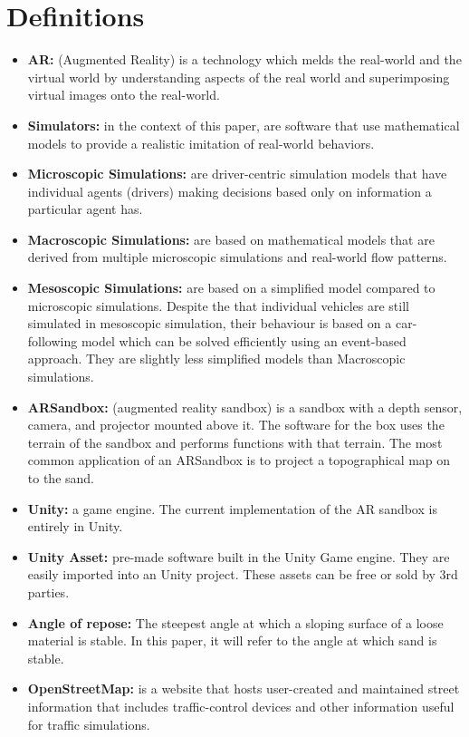 \documentclass[IEEEtran]{article}
\begin{document}
\section*{Definitions}
\begin{itemize}[leftmargin=*,label={}]
    \item \textbf{AR:} (Augmented Reality) is a technology which melds the real-world and the virtual world by understanding aspects of the real world and superimposing virtual images onto the real-world. 
    \item \textbf{Simulators:} in the context of this paper, are software that use mathematical models to provide a realistic imitation of real-world behaviors.  
    \item \textbf{Microscopic Simulations:} are driver-centric simulation models that have individual agents (drivers) making decisions based only on information a particular agent has.
    \item \textbf{Macroscopic Simulations:} are based on mathematical models that are derived from multiple microscopic simulations and real-world flow patterns.
    \item \textbf{Mesoscopic Simulations:} are based on a simplified model compared to microscopic simulations. Despite the that individual vehicles are still simulated in mesoscopic simulation, their behaviour is based on a car-following model which can be solved efficiently using an  event-based approach. They are slightly less simplified models than Macroscopic simulations.
    \item \textbf{ARSandbox:} (augmented reality sandbox) is a sandbox with a depth sensor, camera, and projector mounted above it. The software for the box uses the terrain of the sandbox and performs functions with that terrain. The most common application of an ARSandbox is to project a topographical map on to the sand. 
    \item \textbf{Unity:} a game engine. The current implementation of the AR sandbox is entirely in Unity. 
    \item \textbf{Unity Asset:} pre-made software built in the Unity Game engine. They are easily imported into an Unity project. These assets can be free or sold by 3rd parties.
    \item \textbf{Angle of repose:} The steepest angle at which a sloping surface of a loose material is stable. In this paper, it will refer to the angle at which sand is stable. 
    \item \textbf{OpenStreetMap: } is a website that hosts user-created and maintained street information that includes traffic-control devices and other information useful for traffic simulations.
\end{itemize}
\end{document}

